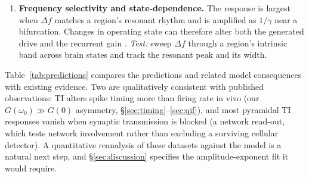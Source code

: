 \documentclass[11pt,a4paper]{article}
\begin{document}
\begin{enumerate}[leftmargin=*]
\item \textbf{Frequency selectivity and state-dependence.} The response is largest
when $\Delta f$ matches a region's resonant rhythm and is amplified as $1/\gamma$ near
a bifurcation. Changes in operating state can therefore alter both the generated
drive and the recurrent gain \cite{ruffini2025cfc}. \emph{Test:}
sweep $\Delta f$ through a region's intrinsic band across brain states and track the
resonant peak and its width.
\end{enumerate}

Table~\ref{tab:predictions} compares the predictions and related model consequences
with existing evidence.
Two are qualitatively consistent with published observations: TI alters spike timing
more than firing rate in vivo \cite{vieira2024} (our $G(\omega_0)\!\gg\!G(0)$ asymmetry,
\S\ref{sec:timing}--\ref{sec:qif}), and most pyramidal TI responses vanish when synaptic
transmission is blocked \cite{caldas2024} (a network read-out, which tests network
involvement rather than excluding a surviving cellular detector). A
quantitative reanalysis of these datasets against the model is a natural next step, and
\S\ref{sec:discussion} specifies the amplitude-exponent fit it would require.
\end{document}
